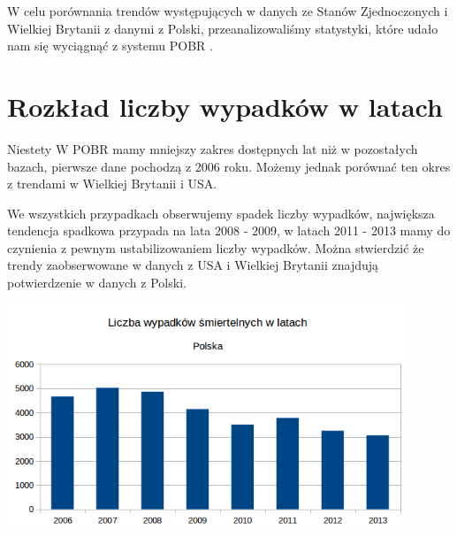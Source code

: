 W celu porównania trendów występujących w danych ze Stanów Zjednoczonych i Wielkiej Brytanii z danymi z Polski, przeanalizowaliśmy statystyki, które udało nam się wyciągnąć z systemu POBR \cite{pobr}.


\section{Rozkład liczby wypadków w latach}

Niestety W POBR mamy mniejszy zakres dostępnych lat niż w pozostałych bazach, pierwsze dane pochodzą z 2006 roku. Możemy jednak porównać ten okres z trendami w Wielkiej Brytanii i USA.

We wszystkich przypadkach obserwujemy spadek liczby wypadków, największa tendencja spadkowa przypada na lata 2008 - 2009, w latach 2011 - 2013 mamy do czynienia z pewnym ustabilizowaniem liczby wypadków. Można stwierdzić że trendy zaobserwowane w danych z USA i Wielkiej Brytanii znajdują potwierdzenie w danych z Polski.

\centerline{\includegraphics[width=0.9\textwidth]{images/statistics/year_pl.png}}

